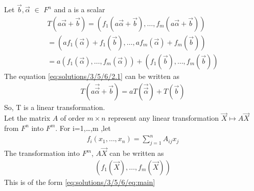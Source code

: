 Let $\vec{b}, \vec{\alpha}$ $\in$ $F^n$ and a is a scalar
\begin{align}
    T(a\vec{\alpha}+\vec{b})=(f_1(a\vec{\alpha}+\vec{b}),\dots,f_m(a\vec{\alpha}+\vec{b})) \nonumber \\
    =(a f_1(\vec{\alpha})+f_1(\vec{b}),\dots,a f_m(\vec{\alpha})+f_m(\vec{b})) \nonumber \\
    =a(f_1(\vec{\alpha}),\dots,f_m(\vec{\alpha}))+(f_1(\vec{b}),\dots,f_m(\vec{b}))\label{eq:solutions/3/5/6/2.1}
\end{align}
The equation \eqref{eq:solutions/3/5/6/2.1} can be written as 
\begin{align}
T(a\vec{\vec{\alpha}}+\vec{b})=aT(\vec{\vec{\alpha}})+T(\vec{b})
\end{align} 
So, T is a linear transformation.\\
Let the matrix $A$ of order $m\times n$ represent any linear transformation $\vec{X} \mapsto A\vec{X}$ from $F^n$ into $F^m$. For i=1,\dots,m ,let
\begin{align}
    f_i(x_1,\dots,x_n)=\sum_{j=1}^nA_{ij}x_j
\end{align}
The transformation into $F^m$, $A\vec{X}$ can be written as 
\begin{align}
   (f_1(\vec{X}),\dots,f_m(\vec{X}))
\end{align}
This is of the form \eqref{eq:solutions/3/5/6/eq:main}
